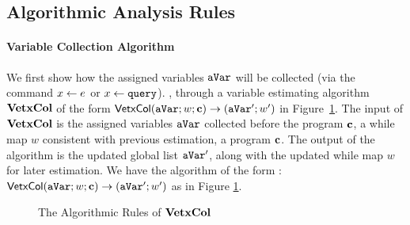 \documentclass[a4paper,11pt]{article}
\begin{document}
\subsection{Algorithmic Analysis Rules}
%
\paragraph{Variable Collection Algorithm}
We first show how the assigned variables $\mathtt{aVar}$ will be collected (via the command $\mathrel{ x \leftarrow e }$ or $\mathrel{ x \leftarrow {\tt query} }$). , through a variable estimating algorithm $\bf{VetxCol}$ of the form $\mathsf{VetxCol}{(\mathtt{aVar}; w; \mathbf{{c}})}\to {( \ensuremath{\mathtt{aVar}}'; w')} $ in Figure~\ref{fig:var_col}. 
The input of $\bf{VetxCol}$ is the assigned variables $\mathtt{aVar}$ collected before the program $\mathbf{{c}}$, a while map $w$ consistent with previous estimation, a program $\mathbf{{c}}$. 
The output of the algorithm is the updated global list $\mathtt{aVar}'$, along with the updated while map $w$ for later estimation.   
%
We have the algorithm of the form : $\mathsf{VetxCol}{(\mathtt{aVar}; w; \mathbf{{c}})}\to {(\ensuremath{\mathtt{aVar}}';w')} $ as in Figure \ref{fig:var_col}. 
%
\begin{figure}
 \caption{The Algorithmic Rules of $\bf{VetxCol}$ }
    \label{fig:var_col}
\end{figure}
\end{document}
